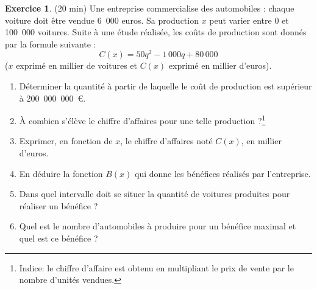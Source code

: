 \documentclass{exam}
\theoremstyle{definition}
\newtheorem{exercice}{Exercice}
\begin{document}
\begin{exercice}{(20 min)}
Une entreprise commercialise des automobiles : chaque voiture doit être vendue 6 000 euros. Sa production $x$ peut varier entre 0 et 100 000 voitures. Suite à une étude réalisée, les coûts de production sont donnés par la formule suivante :
\[
C(x) = 50q^2 - 1\,000q + 80\,000
\]
($x$ exprimé en millier de voitures et $C(x)$ exprimé en millier d’euros).


\begin{enumerate}
    \item Déterminer la quantité à partir de laquelle le coût de production est supérieur à 200 000 000 €.
    \item À combien s’élève le chiffre d’affaires pour une telle production ?\footnote{Indice: le chiffre d'affaire est obtenu en multipliant le prix de vente par le nombre d'unités vendues.}
    \item Exprimer, en fonction de $x$, le chiffre d’affaires noté $C(x)$, en millier d’euros.
    \item En déduire la fonction $B(x)$ qui donne les bénéfices réalisés par l’entreprise.
    \item Dans quel intervalle doit se situer la quantité de voitures produites pour réaliser un bénéfice ?
    \item Quel est le nombre d’automobiles à produire pour un bénéfice maximal et quel est ce bénéfice ?
\end{enumerate}
\end{exercice}    
\end{document}
